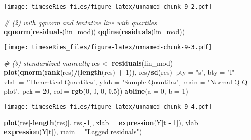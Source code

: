 \documentclass[]{book}
\newenvironment{Shaded}{\begin{snugshade}}{\end{snugshade}}
\newcommand{\KeywordTok}[1]{\textcolor[rgb]{0.13,0.29,0.53}{\textbf{#1}}}
\newcommand{\DataTypeTok}[1]{\textcolor[rgb]{0.13,0.29,0.53}{#1}}
\newcommand{\DecValTok}[1]{\textcolor[rgb]{0.00,0.00,0.81}{#1}}
\newcommand{\FloatTok}[1]{\textcolor[rgb]{0.00,0.00,0.81}{#1}}
\newcommand{\StringTok}[1]{\textcolor[rgb]{0.31,0.60,0.02}{#1}}
\newcommand{\CommentTok}[1]{\textcolor[rgb]{0.56,0.35,0.01}{\textit{#1}}}
\newcommand{\OperatorTok}[1]{\textcolor[rgb]{0.81,0.36,0.00}{\textbf{#1}}}
\newcommand{\NormalTok}[1]{#1}
\begin{document}
\texttt{[image: timeseRies\_files/figure-latex/unnamed-chunk-9-2.pdf]}

\begin{Shaded}
\begin{Highlighting}[]
\CommentTok{# (2) with qqnorm and tentative line with quartiles}
\KeywordTok{qqnorm}\NormalTok{(}\KeywordTok{residuals}\NormalTok{(lin_mod))}
\KeywordTok{qqline}\NormalTok{(}\KeywordTok{residuals}\NormalTok{(lin_mod))}
\end{Highlighting}
\end{Shaded}

\texttt{[image: timeseRies\_files/figure-latex/unnamed-chunk-9-3.pdf]}

\begin{Shaded}
\begin{Highlighting}[]
\CommentTok{# (3) standardized manually}
\NormalTok{res <-}\StringTok{ }\KeywordTok{residuals}\NormalTok{(lin_mod)}
\KeywordTok{plot}\NormalTok{(}\KeywordTok{qnorm}\NormalTok{(}\KeywordTok{rank}\NormalTok{(res)}\OperatorTok{/}\NormalTok{(}\KeywordTok{length}\NormalTok{(res) }\OperatorTok{+}\StringTok{ }\DecValTok{1}\NormalTok{)), res}\OperatorTok{/}\KeywordTok{sd}\NormalTok{(res), }\DataTypeTok{pty =} \StringTok{"s"}\NormalTok{, }\DataTypeTok{bty =} \StringTok{"l"}\NormalTok{, }
    \DataTypeTok{xlab =} \StringTok{"Theoretical Quantiles"}\NormalTok{, }\DataTypeTok{ylab =} \StringTok{"Sample Quantiles"}\NormalTok{, }\DataTypeTok{main =} \StringTok{"Normal Q-Q plot"}\NormalTok{, }
    \DataTypeTok{pch =} \DecValTok{20}\NormalTok{, }\DataTypeTok{col =} \KeywordTok{rgb}\NormalTok{(}\DecValTok{0}\NormalTok{, }\DecValTok{0}\NormalTok{, }\DecValTok{0}\NormalTok{, }\FloatTok{0.5}\NormalTok{))}
\KeywordTok{abline}\NormalTok{(}\DataTypeTok{a =} \DecValTok{0}\NormalTok{, }\DataTypeTok{b =} \DecValTok{1}\NormalTok{)}
\end{Highlighting}
\end{Shaded}

\texttt{[image: timeseRies\_files/figure-latex/unnamed-chunk-9-4.pdf]}

\begin{Shaded}
\begin{Highlighting}[]
\KeywordTok{plot}\NormalTok{(res[}\OperatorTok{-}\KeywordTok{length}\NormalTok{(res)], res[}\OperatorTok{-}\DecValTok{1}\NormalTok{], }\DataTypeTok{xlab =} \KeywordTok{expression}\NormalTok{(Y[t }\OperatorTok{-}\StringTok{ }\DecValTok{1}\NormalTok{]), }\DataTypeTok{ylab =} \KeywordTok{expression}\NormalTok{(Y[t]), }
    \DataTypeTok{main =} \StringTok{"Lagged residuals"}\NormalTok{)}
\end{Highlighting}
\end{Shaded}
\end{document}
